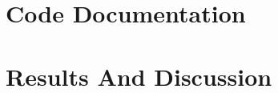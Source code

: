 \documentclass[12pt]{article}
\begin{document}





\section{Code Documentation}


\section{Results And Discussion}

%
%
%
%
%
%
%
%
%
%
\end{document}
